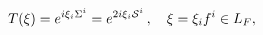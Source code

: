 \begin{equation}\label{TxiS}
T(\xi)=e^{i\xi_i \Sigma^i} =e^{2i\xi_i {\cal S}^i}\,, 
\quad \xi=\xi_i f^i\in L_F, 
\end{equation}

